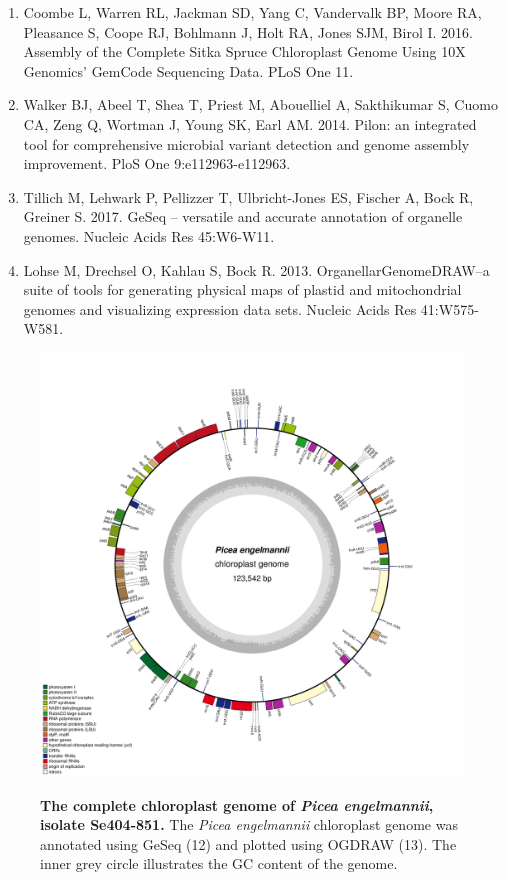 \documentclass[titlepage,11pt, oneside]{article}   	%
\begin{document}
\begin{enumerate}
\item Coombe L, Warren RL, Jackman SD, Yang C, Vandervalk BP, Moore RA, Pleasance S, Coope RJ, Bohlmann J, Holt RA, Jones SJM, Birol I. 2016. Assembly of the Complete Sitka Spruce Chloroplast Genome Using 10X Genomics’ GemCode Sequencing Data. PLoS One 11.
\item Walker BJ, Abeel T, Shea T, Priest M, Abouelliel A, Sakthikumar S, Cuomo CA, Zeng Q, Wortman J, Young SK, Earl AM. 2014. Pilon: an integrated tool for comprehensive microbial variant detection and genome assembly improvement. PloS One 9:e112963-e112963.
\item Tillich M, Lehwark P, Pellizzer T, Ulbricht-Jones ES, Fischer A, Bock R, Greiner S. 2017. GeSeq – versatile and accurate annotation of organelle genomes. Nucleic Acids Res 45:W6-W11.
\item Lohse M, Drechsel O, Kahlau S, Bock R. 2013. OrganellarGenomeDRAW--a suite of tools for generating physical maps of plastid and mitochondrial genomes and visualizing expression data sets. Nucleic Acids Res 41:W575-W581.
\end{enumerate}
\begin{figure}[h]
\centering
\caption{\textbf{The complete chloroplast genome of \textit{Picea engelmannii}, isolate Se404-851.} The \textit{Picea engelmannii} chloroplast genome was annotated using GeSeq (12) and plotted using OGDRAW (13). The inner grey circle illustrates the GC content of the genome.}
\includegraphics[width=1.0\textwidth]{Se404-851}
\label{fig:ogdraw}
\end{figure}
\end{document}
